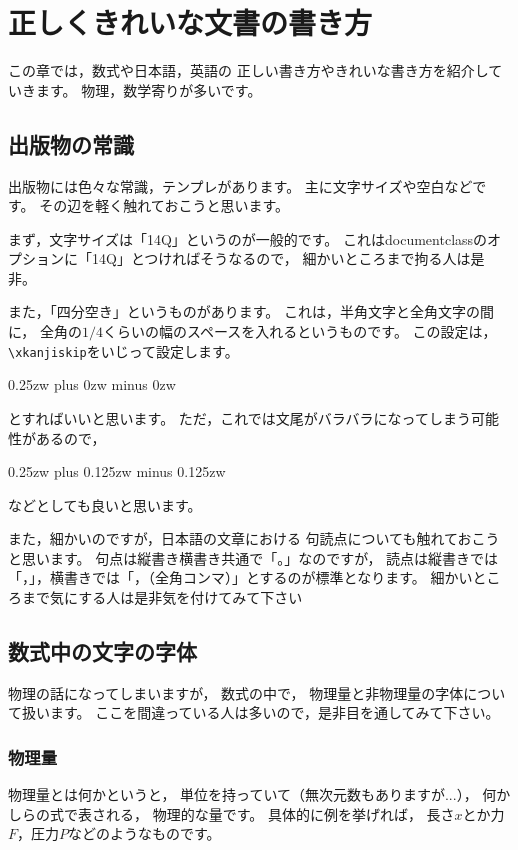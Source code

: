 \chapter{正しくきれいな文書の書き方}
\label{ch:right-words}

この章では，数式や日本語，英語の
正しい書き方やきれいな書き方を紹介していきます。
物理，数学寄りが多いです。


\section{出版物の常識}
出版物には色々な常識，テンプレがあります。
主に文字サイズや空白などです。
その辺を軽く触れておこうと思います。

まず，文字サイズは「14Q」というのが一般的です。
これはdocumentclassのオプションに「14Q」とつければそうなるので，
細かいところまで拘る人は是非。

また，「四分空き」というものがあります。
これは，半角文字と全角文字の間に，
全角の$1/4$くらいの幅のスペースを入れるというものです。
この設定は，\verb|\xkanjiskip|をいじって設定します。
\begin{ITeX}
\xkanjiskip 0.25zw plus 0zw minus 0zw
\end{ITeX}
とすればいいと思います。
ただ，これでは文尾がバラバラになってしまう可能性があるので，
\begin{ITeX}
\xkanjiskip 0.25zw plus 0.125zw minus 0.125zw
\end{ITeX}
などとしても良いと思います。

また，細かいのですが，日本語の文章における
句読点についても触れておこうと思います。
句点は縦書き横書き共通で「。」なのですが，
読点は縦書きでは「，」，横書きでは「，（全角コンマ）」とするのが標準となります。
細かいところまで気にする人は是非気を付けてみて下さい



\section{数式中の文字の字体}
\label{sec:char-in-math}

物理の話になってしまいますが，
数式の中で，
物理量と非物理量の字体について扱います。
ここを間違っている人は多いので，是非目を通してみて下さい。


\subsection{物理量}
物理量とは何かというと，
単位を持っていて（無次元数もありますが...），
何かしらの式で表される，
物理的な量です。
具体的に例を挙げれば，
長さ$x$とか力$F$，圧力$P$などのようなものです。

